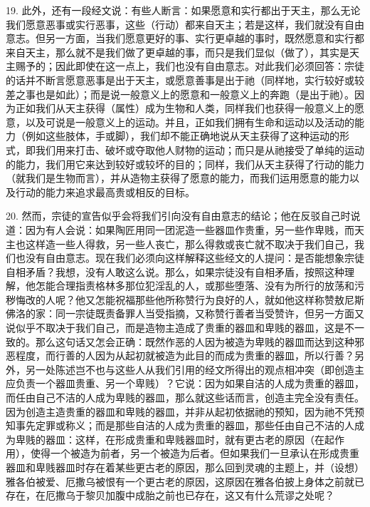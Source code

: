 19. 此外，还有一段经文说：有些人断言：如果愿意和实行都出于天主，那么无论我们愿意恶事或实行恶事，这些（行动）都来自天主；若是这样，我们就没有自由意志。但另一方面，当我们愿意更好的事、实行更卓越的事时，既然愿意和实行都来自天主，那么就不是我们做了更卓越的事，而只是我们显似（做了），其实是天主赐予的；因此即使在这一点上，我们也没有自由意志。对此我们必须回答：宗徒的话并不断言愿意恶事是出于天主，或愿意善事是出于祂（同样地，实行较好或较差之事也是如此）；而是说一般意义上的愿意和一般意义上的奔跑（是出于祂）。因为正如我们从天主获得（属性）成为生物和人类，同样我们也获得一般意义上的愿意，以及可说是一般意义上的运动。并且，正如我们拥有生命和运动以及活动的能力（例如这些肢体，手或脚），我们却不能正确地说从天主获得了这种运动的形式，即我们用来打击、破坏或夺取他人财物的运动；而只是从祂接受了单纯的运动的能力，我们用它来达到较好或较坏的目的；同样，我们从天主获得了行动的能力（就我们是生物而言），并从造物主获得了愿意的能力，而我们运用愿意的能力以及行动的能力来追求最高贵或相反的目标。\par

20. 然而，宗徒的宣告似乎会将我们引向没有自由意志的结论；他在反驳自己时说道：因为有人会说：如果陶匠用同一团泥造一些器皿作贵重，另一些作卑贱，而天主也这样造一些人得救，另一些人丧亡，那么得救或丧亡就不取决于我们自己，我们也没有自由意志。现在我们必须向这样解释这些经文的人提问：是否能想象宗徒自相矛盾？我想，没有人敢这么说。那么，如果宗徒没有自相矛盾，按照这种理解，他怎能合理指责格林多那位犯淫乱的人，或那些堕落、没有为所行的放荡和污秽悔改的人呢？他又怎能祝福那些他所称赞行为良好的人，就如他这样称赞敖尼斯佛洛的家：同一宗徒既责备罪人当受指摘，又称赞行善者当受赞许，但另一方面又说似乎不取决于我们自己，而是造物主造成了贵重的器皿和卑贱的器皿，这是不一致的。那么这句话又怎会正确：既然作恶的人因为被造为卑贱的器皿而达到这种邪恶程度，而行善的人因为从起初就被造为此目的而成为贵重的器皿，所以行善？另外，另一处陈述岂不也与这些人从我们引用的经文所得出的观点相冲突（即创造主应负责一个器皿贵重、另一个卑贱）？它说：因为如果自洁的人成为贵重的器皿，而任由自己不洁的人成为卑贱的器皿，那么就这些话而言，创造主完全没有责任。因为创造主造贵重的器皿和卑贱的器皿，并非从起初依据祂的预知，因为祂不凭预知事先定罪或称义；而是那些自洁的人成为贵重的器皿，那些任由自己不洁的人成为卑贱的器皿：这样，在形成贵重和卑贱器皿时，就有更古老的原因（在起作用），使得一个被造为前者，另一个被造为后者。但如果我们一旦承认在形成贵重器皿和卑贱器皿时存在着某些更古老的原因，那么回到灵魂的主题上，并（设想）雅各伯被爱、厄撒乌被恨有一个更古老的原因，这原因在雅各伯披上身体之前就已存在，在厄撒乌于黎贝加腹中成胎之前也已存在，这又有什么荒谬之处呢？\par

